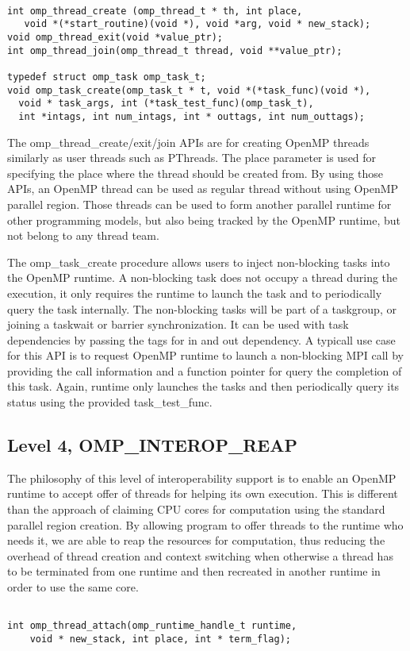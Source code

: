 \lstset{basicstyle=\sffamily\small,language=c, numbersep=1pt}
\begin{lstlisting}[frame=single]  % Start your code-block

int omp_thread_create (omp_thread_t * th, int place,  
   void *(*start_routine)(void *), void *arg, void * new_stack);
void omp_thread_exit(void *value_ptr);
int omp_thread_join(omp_thread_t thread, void **value_ptr);

typedef struct omp_task omp_task_t;
void omp_task_create(omp_task_t * t, void *(*task_func)(void *), 
  void * task_args, int (*task_test_func)(omp_task_t), 
  int *intags, int num_intags, int * outtags, int num_outtags);
\end{lstlisting}
The {\sf omp\_thread\_create/exit/join} APIs are for creating OpenMP threads similarly as user threads such 
as PThreads. The {\sf place} parameter is used for specifying the place where the thread should be created from.  
By using those APIs, an OpenMP thread
can be used as regular thread without using OpenMP parallel region. Those threads can be used to form another parallel runtime for other programming
models, but also being tracked by the OpenMP runtime, but not belong to any thread team. 

The {\sf omp\_task\_create} procedure allows users to inject non-blocking tasks into the OpenMP runtime. A non-blocking task does not occupy
a thread during the execution, it only requires the runtime to launch the task and to periodically query the task internally. The non-blocking
tasks will be part of a {\sf taskgroup}, or joining a {\sf taskwait} or {\sf barrier} synchronization. It can be used with task dependencies by 
passing the tags for in and out dependency. A typicall use case for this API is to request OpenMP runtime to launch a non-blocking MPI call by providing the call information and a function pointer for query the completion of this task. Again, runtime only launches the tasks and then periodically
query its status using the provided {\sf task\_test\_func}.

\subsection{Level 4, OMP\_INTEROP\_REAP} 
The philosophy of this level of interoperability support is to enable an OpenMP runtime to accept offer of threads 
for helping its own execution. This is different than the approach of claiming CPU cores 
for computation using the standard parallel region creation. By allowing program to offer threads to the runtime who needs it, we are able to 
reap the resources for computation, thus reducing the overhead of thread creation and context switching when otherwise 
a thread has to be terminated from
one runtime and then recreated in another runtime in order to use the same core. 
\lstset{basicstyle=\sffamily\small,language=c, numbersep=1pt}
\begin{lstlisting}[frame=single]  % Start your code-block

int omp_thread_attach(omp_runtime_handle_t runtime, 
    void * new_stack, int place, int * term_flag);
\end{lstlisting}


